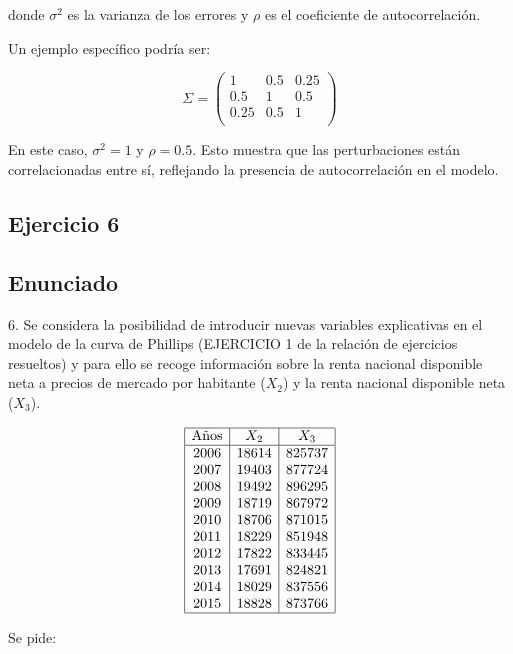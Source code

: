 \documentclass[a4paper,12pt]{article}
\begin{document}
donde \(\sigma^2\) es la varianza de los errores y \(\rho\) es el coeficiente de autocorrelación. 

Un ejemplo específico podría ser:



\[
\Sigma = \begin{pmatrix}
1 & 0.5 & 0.25 \\
0.5 & 1 & 0.5 \\
0.25 & 0.5 & 1 \\
\end{pmatrix}
\]



En este caso, \(\sigma^2 = 1\) y \(\rho = 0.5\). Esto muestra que las perturbaciones están correlacionadas entre sí, reflejando la presencia de autocorrelación en el modelo.

\subsection{Ejercicio 6}
\subsection*{Enunciado}
6. Se considera la posibilidad de introducir nuevas variables explicativas en el modelo de la curva de Phillips (EJERCICIO 1 de la relación de ejercicios resueltos) y para ello se recoge información sobre la renta nacional disponible neta a precios de mercado por habitante (\(X_2\)) y la renta nacional disponible neta (\(X_3\)).



\[
\begin{array}{|c|c|c|}
\hline
\text{Años} & X_2 & X_3 \\
\hline
2006 & 18614 & 825737 \\
2007 & 19403 & 877724 \\
2008 & 19492 & 896295 \\
2009 & 18719 & 867972 \\
2010 & 18706 & 871015 \\
2011 & 18229 & 851948 \\
2012 & 17822 & 833445 \\
2013 & 17691 & 824821 \\
2014 & 18029 & 837556 \\
2015 & 18828 & 873766 \\
\hline
\end{array}
\]



Se pide:
\end{document}
